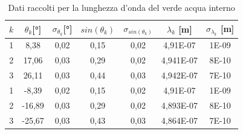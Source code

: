 \documentclass{article}
\begin{document}
        \begin{table}[H]

            \centering

            \begin{tabular}{c c c c c c c}

                \toprule 
                $k$ & $\theta_k$[°] & $\sigma_{\theta_k}$[°] & $sin(\theta_k)$ & $\sigma_{sin(\theta_k)}$ & $\lambda_k$ [m] & $\sigma_{\lambda_k}$ [m] \\
                
                \midrule
                1	&	8,38	&	0,02	&	0,15	&	0,02	&	4,91E-07	&	1E-09\\
                2	&	17,06	&	0,03	&	0,29	&	0,02	&	4,941E-07	&	8E-10\\
                3	&	26,11	&	0,03	&	0,44	&	0,03	&	4,942E-07	&	7E-10\\
                1	&	-8,39	&	0,02	&	0,15	&	0,02	&	4,91E-07	&	1E-09\\
                2	&	-16,89	&	0,03	&	0,29	&	0,02	&	4,893E-07	&	8E-10\\
                3	&	-25,67	&	0,03	&	0,43	&	0,03	&	4,864E-07	&	7E-10\\
                \bottomrule

            \end{tabular}

            \caption{Dati raccolti per la lunghezza d'onda del verde acqua interno}

        \end{table}
        \label{table:verda acq int}
\end{document}
